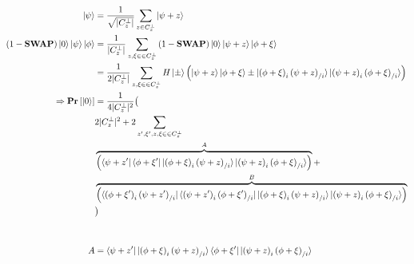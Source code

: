 \documentclass[manuscript,screen,review]{acmart}
\begin{document}
\begin{equation*}
  \begin{split}
    \ket{\psi} & = \frac{1}{\sqrt{|C_{z}^{\perp}|}}\sum_{z \in C_{z}^{\perp}}{ \ket{\psi + z   }} \\ 
    (1-\mathbf{SWAP})\ket{0}\ket{\psi}\ket{\phi} &= \frac{1}{|C_{z}^{\perp}|}\sum_{z,\xi \in  \in C_{z}^{\perp} }{(1-\mathbf{SWAP})\ket{0} \ket{\psi + z   }\ket{\phi + \xi   }}\\
    & = \frac{1}{2|C_{z}^{\perp}|}\sum_{z,\xi \in  \in C_{z}^{\perp} }{  H\ket{\pm} \left( \ket{\psi + z   }\ket{\phi + \xi   }  \pm  \ket{  \left( \phi + \xi \right)_{ i }\left( \psi + z \right)_{ / i }   }\ket{\left( \psi + z \right)_{ i }\left( \phi + \xi \right)_{ / i }  }  \right) }\\
    \Rightarrow \mathbf{Pr} \left[ { \ket{0} } \right] &=  \frac{1}{4|C_{z}^{\perp}|^{2}} \big( \\ 
      & 2 |C_{z}^{\perp}|^{2} + 2 \sum_{z^{\prime},\xi^{\prime},  z,\xi \in  \in C_{z}^{\perp} }   \\
    & \overbrace{ \left(    \bra{\psi + z^{\prime}   }\bra{\phi + \xi^{\prime}   } \ket{  \left( \phi + \xi \right)_{ i }\left( \psi + z \right)_{ / i }   }\ket{\left( \psi + z \right)_{ i }\left( \phi + \xi \right)_{ / i }  }  \right)}^{A} +\\
  &  \overbrace{\left(   \bra{  \left( \phi + \xi^{\prime} \right)_{ i }\left( \psi + z^{\prime} \right)_{ / i }   }\bra{\left( \psi + z^{\prime} \right)_{ i }\left( \phi + \xi^{\prime} \right)_{ / i }  }  \ket{  \left( \phi + \xi \right)_{ i }\left( \psi + z \right)_{ / i }   }\ket{\left( \psi + z \right)_{ i }\left( \phi + \xi \right)_{ / i }  }  \right) }^{B}\\ 
& \big) \\ & \\ & \\  
    A &=     \bra{\psi + z^{\prime}   }\ket{  \left( \phi + \xi \right)_{ i }\left( \psi + z \right)_{ / i }   } \bra{\phi + \xi^{\prime}   } \ket{\left( \psi + z \right)_{ i }\left( \phi + \xi \right)_{ / i }  }  
  \end{split}
\end{equation*}


\printbibliography
\end{document}
